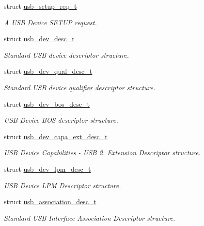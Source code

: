 \begin{DoxyCompactItemize}
\item 
struct \hyperlink{structusb__setup__req__t}{usb\-\_\-setup\-\_\-req\-\_\-t}
\begin{DoxyCompactList}\small\item\em A U\-S\-B Device S\-E\-T\-U\-P request. \end{DoxyCompactList}\item 
struct \hyperlink{structusb__dev__desc__t}{usb\-\_\-dev\-\_\-desc\-\_\-t}
\begin{DoxyCompactList}\small\item\em Standard U\-S\-B device descriptor structure. \end{DoxyCompactList}\item 
struct \hyperlink{structusb__dev__qual__desc__t}{usb\-\_\-dev\-\_\-qual\-\_\-desc\-\_\-t}
\begin{DoxyCompactList}\small\item\em Standard U\-S\-B device qualifier descriptor structure. \end{DoxyCompactList}\item 
struct \hyperlink{structusb__dev__bos__desc__t}{usb\-\_\-dev\-\_\-bos\-\_\-desc\-\_\-t}
\begin{DoxyCompactList}\small\item\em U\-S\-B Device B\-O\-S descriptor structure. \end{DoxyCompactList}\item 
struct \hyperlink{structusb__dev__capa__ext__desc__t}{usb\-\_\-dev\-\_\-capa\-\_\-ext\-\_\-desc\-\_\-t}
\begin{DoxyCompactList}\small\item\em U\-S\-B Device Capabilities -\/ U\-S\-B 2. Extension Descriptor structure. \end{DoxyCompactList}\item 
struct \hyperlink{structusb__dev__lpm__desc__t}{usb\-\_\-dev\-\_\-lpm\-\_\-desc\-\_\-t}
\begin{DoxyCompactList}\small\item\em U\-S\-B Device L\-P\-M Descriptor structure. \end{DoxyCompactList}\item 
struct \hyperlink{structusb__association__desc__t}{usb\-\_\-association\-\_\-desc\-\_\-t}
\begin{DoxyCompactList}\small\item\em Standard U\-S\-B Interface Association Descriptor structure. \end{DoxyCompactList}\item 

\end{DoxyCompactItemize}
